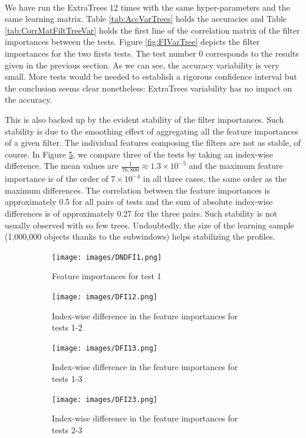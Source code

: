 \documentclass[a4paper]{report}
\begin{document}
		
		\paragraph{}
		We have run the ExtraTrees 12 times with the same hyper-parameters and the same learning matrix. Table \ref{tab:AccVarTrees} holds the accuracies and Table \ref{tab:CorrMatFiltTreeVar} holds the first line of the correlation matrix of the filter importances between the tests. Figure \ref{fig:FIVarTree} depicts the filter importances for the two firsts tests. The test number 0 corresponds to the results given in the previous section. As we can see, the accuracy variability is very small. More tests would be needed to establish a rigorous confidence interval but the conclusion seems clear nonetheless: ExtraTrees variability has no impact on the accuracy. 
		\par
		This is also backed up by the evident stability of the filter importances. Such stability is due to the smoothing effect of aggregating all the feature importances of a given filter. The individual features composing the filters are not as stable, of course. In Figure \ref{fig:DFIVarTree}, we compare three of the tests by taking an index-wise difference. The mean values are $\frac{1}{76,800} \approx 1.3 \times 10^{-5}$ and the maximum feature importance is of the order of $7\times 10^{-4}$ in all three cases, the same order as the maximum differences. The correlation between the feature importances is approximately 0.5 for all pairs of tests and the sum of absolute index-wise differences is of approximately 0.27 for the three pairs. Such stability is not usually observed with so few trees. Undoubtedly, the size of the learning sample (1,000,000 objects thanks to the subwindows) helps stabilizing the profiles.
		
		\begin{figure}
			\begin{subfigure}{.5\textwidth}
				\centering
				\texttt{[image: images/DNDFI1.png]}
				\caption{\label{fig:DNDFI1}Feature importances for test 1}
			\end{subfigure}%
			\begin{subfigure}{.5\textwidth}
				\centering
				\texttt{[image: images/DFI12.png]}
				\caption{\label{fig:DFI12}Index-wise difference in the feature importances for tests 1-2}
			\end{subfigure}
			\begin{subfigure}{.5\textwidth}
				\centering
				\texttt{[image: images/DFI13.png]}
				\caption{\label{fig:DFI13}Index-wise difference in the feature importances for tests 1-3}
			\end{subfigure}%
			\begin{subfigure}{.5\textwidth}
				\centering
				\texttt{[image: images/DFI23.png]}
				\caption{\label{fig:DF213}Index-wise difference in the feature importances for tests 2-3}
			\end{subfigure}
			\caption{\label{fig:DFIVarTree}}
		\end{figure}
		
\end{document}
